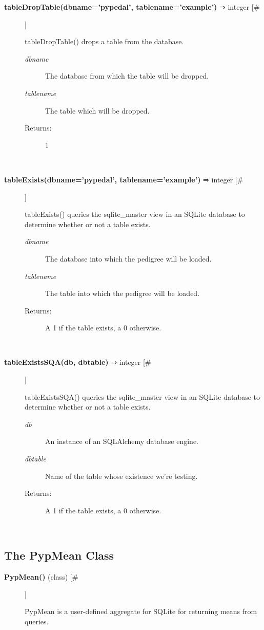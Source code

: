\documentclass{article}
\begin{document}
\begin{description}
\item[\textbf{tableDropTable(dbname='pypedal', tablename='example')} ⇒ integer [\#]
]
\par tableDropTable() drops a table from the database.
\begin{description}
\item[\textit{dbname}
]
The database from which the table will be dropped.
\item[\textit{tablename}
]
The table which will be dropped.
\item[Returns:
]
1
\end{description}\\

\item[\textbf{tableExists(dbname='pypedal', tablename='example')} ⇒ integer [\#]
]
\par tableExists() queries the sqlite\_master view in an SQLite database to
determine whether or not a table exists.
\begin{description}
\item[\textit{dbname}
]
The database into which the pedigree will be loaded.
\item[\textit{tablename}
]
The table into which the pedigree will be loaded.
\item[Returns:
]
A 1 if the table exists, a 0 otherwise.
\end{description}\\

\item[\textbf{tableExistsSQA(db, dbtable)} ⇒ integer [\#]
]
\par tableExistsSQA() queries the sqlite\_master view in an SQLite database to
determine whether or not a table exists.
\begin{description}
\item[\textit{db}
]
An instance of an SQLAlchemy database engine.
\item[\textit{dbtable}
]
Name of the table whose existence we're testing.
\item[Returns:
]
A 1 if the table exists, a 0 otherwise.
\end{description}\\

\end{description}
\subsection*{The PypMean Class}
\begin{description}
\item[\textbf{PypMean()} (class) [\#]
]
\par PypMean is a user-defined aggregate for SQLite for returning means from queries.

\end{description}
\end{document}
